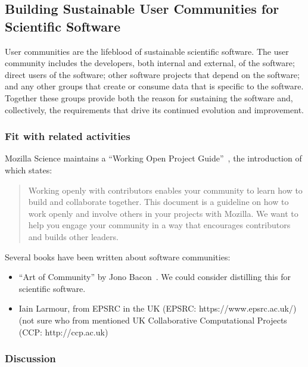 \subsection{Building Sustainable User Communities for Scientific Software}


User communities are the lifeblood of sustainable scientific software. The user
community includes the developers, both internal and external, of the software;
direct users of the software; other software projects that depend on the
software; and any other groups that create or consume data that is specific to
the software. Together these groups provide both the reason for sustaining the
software and, collectively, the requirements that drive its continued evolution
and improvement.

\subsubsection{Fit with related activities}

Mozilla Science maintains a ``Working Open Project
Guide''~\cite{working-open-wssspe3}, the introduction of which states:
\begin{quote}
Working openly with contributors enables your community to learn how to build
and collaborate together. This document is a guideline on how to work openly and
involve others in your projects with Mozilla. We want to help you engage your
community in a way that encourages contributors and builds other leaders.
 \end{quote}

Several books have been written about software communities:
\begin{itemize}

\item ``Art of Community'' by Jono Bacon~\cite{art-of-community}. We could
consider distilling this for scientific software.

\item Iain Larmour, from EPSRC in the UK (EPSRC: https://www.epsrc.ac.uk/) (not
sure who from mentioned UK Collaborative Computational Projects (CCP:
http://ccp.ac.uk)

\end{itemize}

\subsubsection{Discussion}

